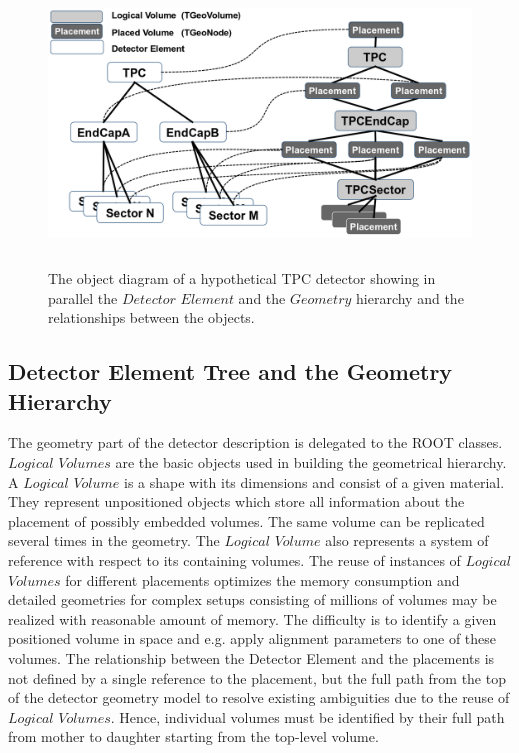 \documentclass[10pt,a4paper]{article}
\begin{document}
\begin{figure}[h]
  \begin{center}
    \includegraphics[height=75mm] {DD4hep_detelement_tree}
    \caption{The object diagram of a hypothetical TPC detector showing in
    parallel the $Detector$ $Element$ and the $Geometry$ hierarchy and the 
    relationships between the objects.}
    \label{fig:dd4hep-hierarchies}
  \end{center}
  \vspace{-0.5cm}
\end{figure}


\subsection{Detector Element Tree and the Geometry Hierarchy}
\label{subsect:detelement-hierarchy}
\noindent
The geometry part of the detector description is delegated to the ROOT classes.
$Logical$ $Volumes$ are the basic objects used in building the geometrical hierarchy. 
A $Logical$ $Volume$ is a shape with its dimensions and consist of a given material. 
They represent unpositioned objects which store all information about 
the placement of possibly embedded volumes. The same
volume can be replicated several times in the geometry. The $Logical$ $Volume$ 
also represents a system of reference with respect to its containing volumes.
The reuse of instances of $Logical$ $Volumes$ for different placements 
optimizes the memory consumption and detailed geometries for complex setups
consisting of millions of volumes may be realized with reasonable amount of memory.
The difficulty is to identify a given positioned volume 
in space and e.g. apply alignment parameters to one of these volumes. 
The relationship between the Detector Element and the placements
is not defined by a single reference to the placement, but the full path 
from the top of the detector geometry model to resolve existing
ambiguities due to the reuse of $Logical$ $Volumes$.
Hence, individual volumes must be identified by their full path from mother 
to daughter starting from the top-level volume. 
\end{document}
